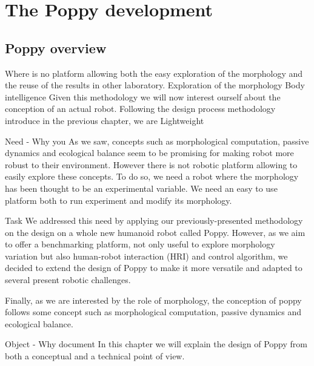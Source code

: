 

% 


\chapter{The Poppy development} %

\section{Poppy overview} %

Where is no platform allowing both the easy exploration of the morphology and the reuse of the results in other laboratory.
Exploration of the morphology
Body intelligence
Given this methodology we will now interest ourself about the conception of an actual robot.
Following the design process methodology introduce in the previous chapter, we are
Lightweight


Need - Why you
As we saw, concepts such as morphological computation, passive dynamics and ecological balance seem to be promising for making robot more robust to their environment. However there is not robotic platform allowing to easily explore these concepts. To do so, we need a robot where the morphology has been thought to be an experimental variable.
We need an easy to use platform both to run experiment and modify its morphology.






Task
We addressed this need by applying our previously-presented methodology on the design on a whole new humanoid robot called Poppy.
However, as we aim to offer a benchmarking platform, not only useful to explore morphology variation but also human-robot interaction (HRI) and control algorithm, we decided to extend the design of Poppy to make it more versatile and adapted to several present robotic challenges.

Finally, as we are interested by the role of morphology, the conception of poppy follows some concept such as morphological computation, passive dynamics and ecological balance.

Object - Why document
In this chapter we will explain the design of Poppy from both a conceptual and a technical point of view.

